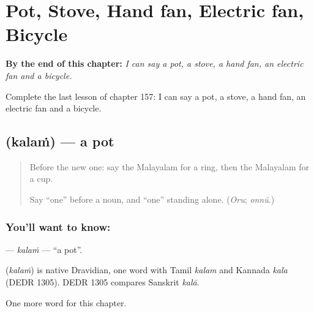 
\chapter{Pot, Stove, Hand fan, Electric fan, Bicycle}
\label{ch:ml-pot-stove-hand-fan-electric-fan-bicycle}

\begin{chapteropening}
\textbf{By the end of this chapter:} \emph{I can say a pot, a stove, a hand fan, an electric fan and a bicycle.}

Complete the last lesson of chapter 157: I can say a pot, a stove, a hand fan, an electric fan and a bicycle.
\end{chapteropening}

\section[\texorpdfstring{\ml{കലം} (kalaṁ)}{കലം (kalaṁ)}]{ (kalaṁ) — a pot}

\label{lesson:ML-C157-kalam}



\begin{quote}
Before the new one: say the Malayalam for a ring, then the Malayalam for a cup.

Say \textquotedblleft{}one\textquotedblright{} before a noun, and \textquotedblleft{}one\textquotedblright{} standing alone. (\emph{Oru}; \emph{onnŭ}.)
\end{quote}

\subsection*{You'll want to know: }
\textbf{} — \emph{kalaṁ} — \textquotedblleft{}a pot\textquotedblright{}.

\begin{cousinweb}
\textbf{} (\emph{kalaṁ}) is native Dravidian, one word with Tamil \emph{kalam} and Kannada \emph{kala} (DEDR 1305). DEDR 1305 compares Sanskrit \emph{kalā}.
\end{cousinweb}

\begin{grammarlens}[title={What you've built}]
One more word for this chapter.
\end{grammarlens}

